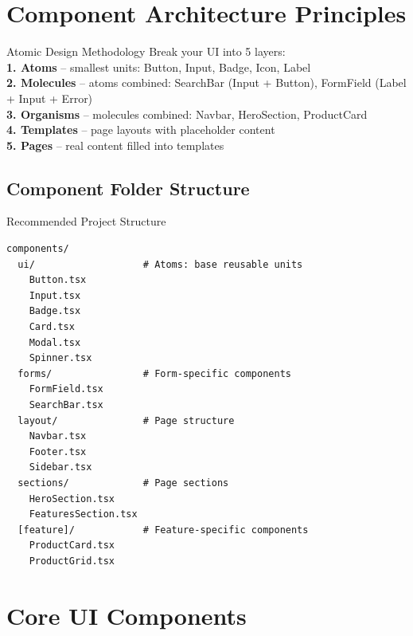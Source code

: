 \documentclass[12pt,a4paper]{article}
\begin{document}
\section{Component Architecture Principles}

\begin{infobox}{Atomic Design Methodology}
Break your UI into 5 layers:\\[0.3cm]
\textbf{1. Atoms} -- smallest units: Button, Input, Badge, Icon, Label\\
\textbf{2. Molecules} -- atoms combined: SearchBar (Input + Button), FormField (Label + Input + Error)\\
\textbf{3. Organisms} -- molecules combined: Navbar, HeroSection, ProductCard\\
\textbf{4. Templates} -- page layouts with placeholder content\\
\textbf{5. Pages} -- real content filled into templates
\end{infobox}

\subsection{Component Folder Structure}
\begin{codebox}{Recommended Project Structure}
\begin{lstlisting}
components/
  ui/                   # Atoms: base reusable units
    Button.tsx
    Input.tsx
    Badge.tsx
    Card.tsx
    Modal.tsx
    Spinner.tsx
  forms/                # Form-specific components
    FormField.tsx
    SearchBar.tsx
  layout/               # Page structure
    Navbar.tsx
    Footer.tsx
    Sidebar.tsx
  sections/             # Page sections
    HeroSection.tsx
    FeaturesSection.tsx
  [feature]/            # Feature-specific components
    ProductCard.tsx
    ProductGrid.tsx
\end{lstlisting}
\end{codebox}

\newpage

\section{Core UI Components}
\end{document}
